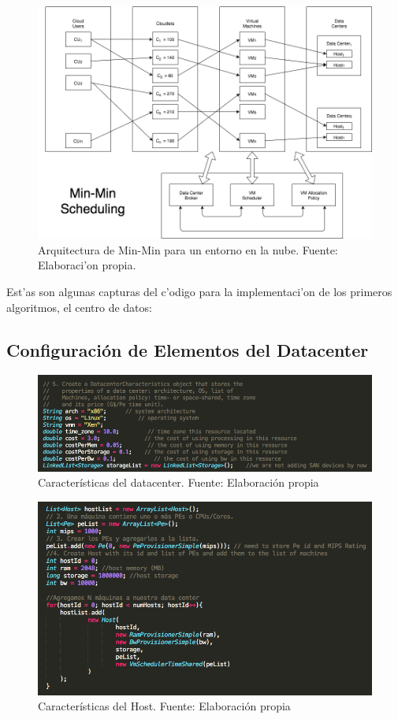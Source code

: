 \begin{figure}
	\caption{Arquitectura de Min-Min para un entorno en la nube. Fuente: Elaboraci'on propia.}
	\centering
	\includegraphics[scale=0.5]{media/imagencinco}
\end{figure}

\newpage

Est'as son algunas capturas del c'odigo para la implementaci'on de los primeros algoritmos, el centro de datos:

\subsection*{Configuración de Elementos del Datacenter}

\begin{figure}
	\caption{Características del datacenter. Fuente: Elaboración propia}
	\centering
	\includegraphics[scale=0.5]{media/caracteristicas_datacenter}
\end{figure}

\begin{figure}
	\caption{Características del Host. Fuente: Elaboración propia}
	\centering
	\includegraphics[scale=0.5]{media/caracteristicas_host}
\end{figure}

